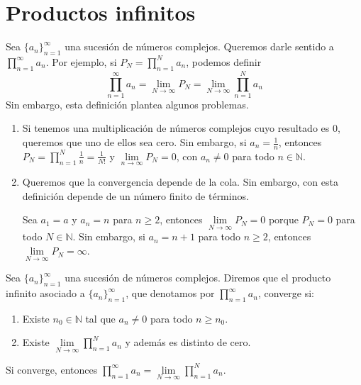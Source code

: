 \section{Productos infinitos}
Sea $\{a_n\}_{n=1}^\infty$ una sucesión de números complejos.
Queremos darle sentido a $\prod_{n=1}^\infty a_n$.
Por ejemplo, si $P_N = \prod_{n=1}^N a_n$, podemos definir
$$\prod_{n=1}^\infty a_n = \lim_{N \to \infty} P_N = \lim_{N \to \infty} \prod_{n=1}^N a_n$$
Sin embargo, esta definición plantea algunos problemas.
\begin{enumerate}
    \item Si tenemos una multiplicación de números complejos cuyo resultado es 0, queremos que uno de ellos sea cero.
          Sin embargo, si $a_n = \frac{1}{n}$, entonces $P_N = \prod_{n=1}^N \frac{1}{n} = \frac{1}{N!}$ y $\lim\limits_{n \to \infty} P_N = 0$, con $a_n \neq 0$ para todo $n \in \mathbb{N}$.

    \item Queremos que la convergencia depende de la cola.
          Sin embargo, con esta definición depende de un número finito de términos.

          Sea $a_1 = a$ y $a_n = n$ para $n \geq 2$, entonces $\lim\limits_{N \to \infty} P_N = 0$ porque $P_N = 0$ para todo $N \in \mathbb{N}$.
          Sin embargo, si $a_n = n+1$ para todo $n \geq 2$, entonces $\lim\limits_{N \to \infty} P_N = \infty$.
\end{enumerate}

\begin{definition}
    Sea $\{a_n\}_{n=1}^\infty$ una sucesión de números complejos.
    Diremos que el producto infinito asociado a $\{a_n\}_{n=1}^\infty$, que denotamos por $\prod_{n=1}^\infty a_n$, converge si:
    \begin{enumerate}
        \item Existe $n_0 \in \mathbb{N}$ tal que $a_n \neq 0$ para todo $n \geq n_0$.
        \item Existe $\lim\limits_{N \to \infty} \prod_{n=1}^N a_n$ y además es distinto de cero.
    \end{enumerate}
    Si converge, entonces $\prod_{n=1}^\infty a_n = \lim\limits_{N \to \infty} \prod_{n=1}^N a_n$.
\end{definition}

